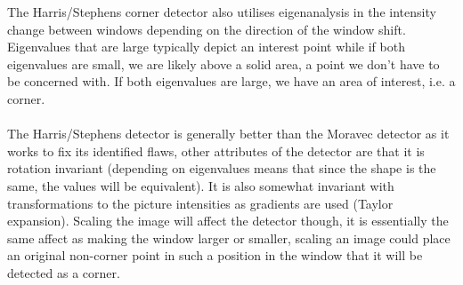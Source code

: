 \documentclass[11pt]{article}
\begin{document}
The Harris/Stephens corner detector also utilises eigenanalysis in the
intensity change between windows depending on the direction of the window 
shift. Eigenvalues that are large typically depict an interest point
while if both eigenvalues are small, we are likely above a solid area,
a point we don't have to be concerned with. If both eigenvalues are large,
we have an area of interest, i.e. a corner. \\
\\
The Harris/Stephens detector is generally better than the Moravec 
detector as it works to fix its identified flaws, other attributes of
the detector are that it is rotation invariant (depending on eigenvalues 
means that since the shape is the same, the values will be equivalent). 
It is also somewhat invariant with transformations to the picture
intensities as gradients are used (Taylor expansion). Scaling the
image will affect the detector though, it is essentially the same
affect as making the window larger or smaller, scaling an image
could place an original non-corner point in such a position in the
window that it will be detected as a corner.
\end{document}
